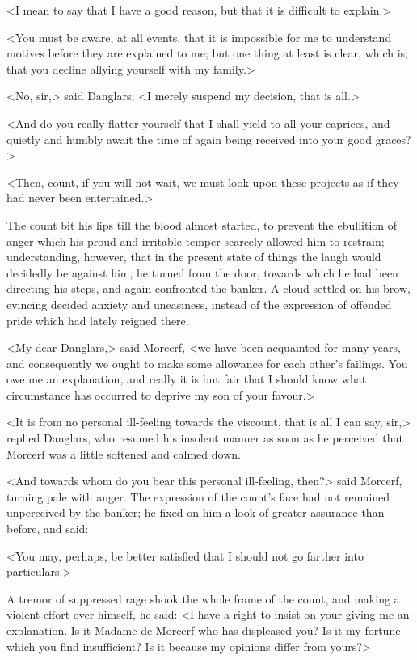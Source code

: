  <I mean to say that I have a good reason, but that it is difficult to explain.> 

 <You must be aware, at all events, that it is impossible for me to understand motives before they are explained to me; but one thing at least is clear, which is, that you decline allying yourself with my family.> 

 <No, sir,> said Danglars; <I merely suspend my decision, that is all.> 

 <And do you really flatter yourself that I shall yield to all your caprices, and quietly and humbly await the time of again being received into your good graces?> 

 <Then, count, if you will not wait, we must look upon these projects as if they had never been entertained.> 

 The count bit his lips till the blood almost started, to prevent the ebullition of anger which his proud and irritable temper scarcely allowed him to restrain; understanding, however, that in the present state of things the laugh would decidedly be against him, he turned from the door, towards which he had been directing his steps, and again confronted the banker. A cloud settled on his brow, evincing decided anxiety and uneasiness, instead of the expression of offended pride which had lately reigned there. 

 <My dear Danglars,> said Morcerf, <we have been acquainted for many years, and consequently we ought to make some allowance for each other's failings. You owe me an explanation, and really it is but fair that I should know what circumstance has occurred to deprive my son of your favour.> 

 <It is from no personal ill-feeling towards the viscount, that is all I can say, sir,> replied Danglars, who resumed his insolent manner as soon as he perceived that Morcerf was a little softened and calmed down. 

 <And towards whom do you bear this personal ill-feeling, then?> said Morcerf, turning pale with anger. The expression of the count's face had not remained unperceived by the banker; he fixed on him a look of greater assurance than before, and said: 

 <You may, perhaps, be better satisfied that I should not go farther into particulars.> 

 A tremor of suppressed rage shook the whole frame of the count, and making a violent effort over himself, he said: <I have a right to insist on your giving me an explanation. Is it Madame de Morcerf who has displeased you? Is it my fortune which you find insufficient? Is it because my opinions differ from yours?> 

